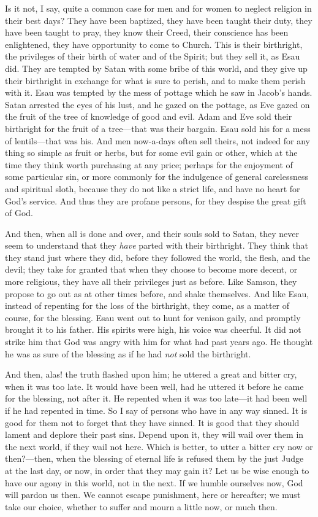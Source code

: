 Is it not, I say, quite a common case for men and for women to
neglect religion in their best days? They have been baptized, they have
been taught their duty, they have been taught to pray, they know their
Creed, their conscience has been enlightened, they have opportunity to
come to Church. This is their birthright, the privileges of their birth
of water and of the Spirit; but they sell it, as Esau did. They are
tempted by Satan with some bribe of this world, and they give up their
birthright in exchange for what is sure to perish, and to make them
perish with it. Esau was tempted by the mess of pottage which he saw in
Jacob's hands. Satan arrested the eyes of his lust, and he gazed on the
pottage, as Eve gazed on the fruit of the tree of knowledge of good and
evil. Adam and Eve sold their birthright for the fruit of a tree—that
was their bargain. Esau sold his for a mess of lentils—that was his.
And men now-a-days often sell theirs, not indeed for any thing so simple
as fruit or herbs, but for some evil gain or other, which at the time
they think worth purchasing at any price; perhaps for the enjoyment of
some particular sin, or more commonly for the indulgence of general
carelessness and spiritual sloth, because they do not like a strict
life, and have no heart for God's service. And thus they are profane
persons, for they despise the great gift of God.

And then, when all is done and over, and their souls sold to Satan,
they never seem to understand that they \emph{have} parted with their
birthright. They think that they stand just where they did, before they
followed the world, the flesh, and the devil; they take for granted that
when they choose to become more decent, or more religious, they have all
their privileges just as before. Like Samson, they propose to go out as
at other times before, and shake themselves. And like Esau, instead of
repenting for the loss of the birthright, they come, as a matter of
course, for the blessing. Esau went out to hunt for venison gaily, and
promptly brought it to his father. His spirits were high, his voice was
cheerful. It did not strike him that God was angry with him for what had
past years ago. He thought he was as sure of the blessing as if he had \emph{not}
sold the birthright.

And then, alas! the truth flashed upon him; he uttered a great and
bitter cry, when it was too late. It would have been well, had he
uttered it before he came for the blessing, not after it. He repented
when it was too late—it had been well if he had repented in time. So I
say of persons who have in any way sinned. It is good for them not to
forget that they have sinned. It is good that they should lament and
deplore their past sins. Depend upon it, they will wail over them in the
next world, if they wail not here. Which is better, to utter a bitter
cry now or then?—then, when the blessing of eternal life is refused
them by the just Judge at the last day, or now, in order that they may
gain it? Let us be wise enough to have our agony in this world, not in
the next. If we humble ourselves now, God will pardon us then. We cannot
escape punishment, here or hereafter; we must take our choice, whether
to suffer and mourn a little now, or much then.

